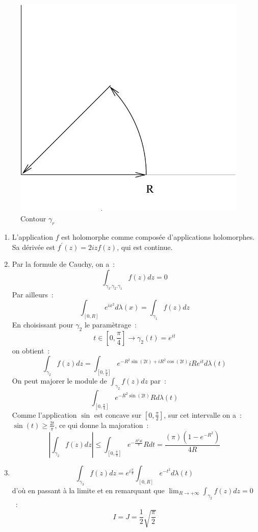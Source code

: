 \documentclass[a4paper, 12pt]{amsart}
\begin{document}
 \begin{figure}[ht]
\includegraphics[scale=0.3]{contour_fresnel.pdf}
\caption{Contour $\gamma_r$}\label{fig:contour2}
\end{figure}
\begin{enumerate}
\item L'application $f$ est holomorphe comme composée d'applications
holomorphes. Sa dérivée est $f^\prime(z) = 2 i z f(z)$, qui est continue. 
\item
Par la formule de Cauchy, on a~:
\[
\int_{\gamma_3 . \gamma_2 . \gamma_1} f(z) dz = 0
\]
Par ailleurs~:
\[
\int_{[0,R]} e^{ix^2}d \lambda(x) = \int_{\gamma_1} f(z) dz
\]
En choisissant pour $\gamma_2$ le paramètrage~:
\[
t \in [0, \frac{\pi}{4}] \to \gamma_2(t) = e^{it}
\]
on obtient~:
\[
\int_{\gamma_2} f(z) dz = \int_{[0, \frac{\pi}{4}]} e^{-R^2 \sin (2t)
+ i R^2 \cos(2t)} i R e^{it} d \lambda(t)
\]
On peut majorer le module de $\int_{\gamma_2} f(z) dz$ par~:
\[
\int_{[0, \frac{\pi}{4}]} e^{-R^2 \sin (2t)}  R d \lambda(t)
\]
Comme l'application $\sin$ est concave sur $[0, \frac{\pi}{2}]$, sur
cet intervalle on a~: $\sin(t) \geq \frac{2 t}{\pi}$, ce qui donne la
majoration~:
\[
\left | \int_{\gamma_2} f(z) dz \right | \leq 
\int_{[0, \frac{\pi}{4}]} e^{-\frac{R^2 4 t}{\pi}} R dt =
\frac{(\pi)(1- e^{-R^2})}{4 R}
\]
\item
\[
\int_{\gamma_3} f(z) dz = e^{i \frac{\pi}{4}} \int_{[0,R]} e^{-t^2} d\lambda(t)
\]
d'où en passant à la limite et en remarquant que $\lim_{R \to
+\infty}\int_{\gamma_2} f(z) dz = 0$~:
\[
I = J = \frac{1}{2} \sqrt{\frac{\pi}{2}}
\]
\end{enumerate}
\end{document}
